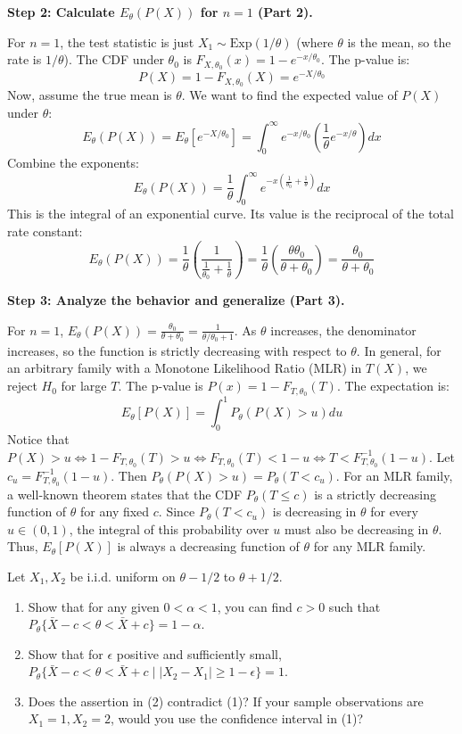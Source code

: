 \begin{solution}
\textbf{Step 2: Calculate $E_\theta(P(X))$ for $n=1$ (Part 2).}

For $n=1$, the test statistic is just $X_1 \sim \text{Exp}(1/\theta)$ (where $\theta$ is the mean, so the rate is $1/\theta$).
The CDF under $\theta_0$ is $F_{X, \theta_0}(x) = 1 - e^{-x/\theta_0}$.
The p-value is:
\[ P(X) = 1 - F_{X, \theta_0}(X) = e^{-X/\theta_0} \]
Now, assume the true mean is $\theta$. We want to find the expected value of $P(X)$ under $\theta$:
\[ E_\theta(P(X)) = E_\theta[e^{-X/\theta_0}] = \int_0^\infty e^{-x/\theta_0} \left( \frac{1}{\theta} e^{-x/\theta} \right) dx \]
Combine the exponents:
\[ E_\theta(P(X)) = \frac{1}{\theta} \int_0^\infty e^{-x \left( \frac{1}{\theta_0} + \frac{1}{\theta} \right)} dx \]
This is the integral of an exponential curve. Its value is the reciprocal of the total rate constant:
\[ E_\theta(P(X)) = \frac{1}{\theta} \left( \frac{1}{\frac{1}{\theta_0} + \frac{1}{\theta}} \right) = \frac{1}{\theta} \left( \frac{\theta \theta_0}{\theta + \theta_0} \right) = \frac{\theta_0}{\theta + \theta_0} \]

\textbf{Step 3: Analyze the behavior and generalize (Part 3).}

For $n=1$, $E_\theta(P(X)) = \frac{\theta_0}{\theta+\theta_0} = \frac{1}{\theta/\theta_0 + 1}$. As $\theta$ increases, the denominator increases, so the function is strictly decreasing with respect to $\theta$.
In general, for an arbitrary family with a Monotone Likelihood Ratio (MLR) in $T(X)$, we reject $H_0$ for large $T$.
The p-value is $P(x) = 1 - F_{T, \theta_0}(T)$.
The expectation is:
\[ E_\theta[P(X)] = \int_0^1 P_\theta(P(X) > u) du \]
Notice that $P(X) > u \iff 1 - F_{T, \theta_0}(T) > u \iff F_{T, \theta_0}(T) < 1-u \iff T < F_{T, \theta_0}^{-1}(1-u)$.
Let $c_u = F_{T, \theta_0}^{-1}(1-u)$. Then $P_\theta(P(X) > u) = P_\theta(T < c_u)$.
For an MLR family, a well-known theorem states that the CDF $P_\theta(T \leq c)$ is a strictly decreasing function of $\theta$ for any fixed $c$.
Since $P_\theta(T < c_u)$ is decreasing in $\theta$ for every $u \in (0,1)$, the integral of this probability over $u$ must also be decreasing in $\theta$.
Thus, $E_\theta[P(X)]$ is always a decreasing function of $\theta$ for any MLR family.
\end{solution}

\begin{exercise}
\label{probability:2013:5}
Let $X_1, X_2$ be i.i.d. uniform on $\theta - 1/2$ to $\theta + 1/2$.
\begin{enumerate}
    \item Show that for any given $0 < \alpha < 1$, you can find $c > 0$ such that $P_\theta\{\bar{X} - c < \theta < \bar{X} + c\} = 1 - \alpha$.
    \item Show that for $\epsilon$ positive and sufficiently small, $P_\theta\{\bar{X} - c < \theta < \bar{X} + c \mid |X_2 - X_1| \geq 1 - \epsilon\} = 1$.
    \item Does the assertion in (2) contradict (1)? If your sample observations are $X_1 = 1, X_2 = 2$, would you use the confidence interval in (1)?
\end{enumerate}
\end{exercise}

